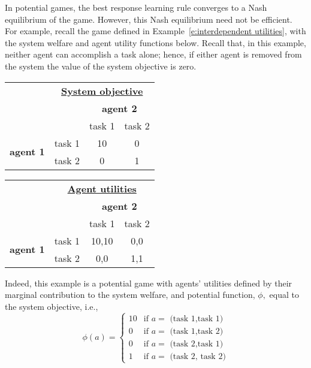 In potential games, the best response learning rule converges to a Nash equilibrium of the game. However, this Nash equilibrium need not be efficient. For example, recall the game defined in Example~\ref{e:interdependent utilities}, with the system welfare and agent utility functions below. Recall that, in this example, neither agent can accomplish a task alone; hence, if either agent is removed from the system the value of the system objective is zero.

\begin{center}
\begin{tabular}{rr|c|c|}
\multicolumn{1}{c}{}&\multicolumn{3}{c}{\textbf{\underline{System objective}}}\\
\multicolumn{2}{r}{}&\multicolumn{2}{c}{\textbf{agent 2}}\\
\multicolumn{2}{r}{}
 &  \multicolumn{1}{c}{task 1}
 & \multicolumn{1}{c}{task 2} \\
\cline{3-4}
\multirow{2}{*}{\textbf{agent 1}}
&task 1 & 10 & 0 \\
\cline{3-4}
&task 2 & 0 & 1 \\
\cline{3-4}
\end{tabular}\quad\quad\quad
\begin{tabular}{rr|c|c|}
\multicolumn{1}{c}{}&\multicolumn{3}{c}{\textbf{\underline{Agent utilities}}}\\
\multicolumn{2}{r}{}&\multicolumn{2}{c}{\textbf{agent 2}}\\
\multicolumn{2}{r}{}
 &  \multicolumn{1}{c}{task 1}
 & \multicolumn{1}{c}{task 2} \\
\cline{3-4}
\multirow{2}{*}{\textbf{agent 1}}
&task 1 & \cellcolor[gray]{0.8}10,10 & 0,0 \\
\cline{3-4}
&task 2 & 0,0 & \cellcolor[gray]{0.8}1,1 \\
\cline{3-4}
\end{tabular}
\end{center}
\medskip

Indeed, this example is a potential game with agents' utilities defined by their marginal contribution to the system welfare, and potential function, $\phi,$ equal to the system objective, i.e.,
\begin{equation}
\phi(a) = 
\begin{cases}
10 & \text{if $a =$ (task 1,task 1)}\\
0 & \text{if $a =$ (task 1,task 2)}\\
0 & \text{if $a =$ (task 2,task 1)}\\
1 & \text{if $a = $ (task 2, task 2)}
\end{cases}
\end{equation}


